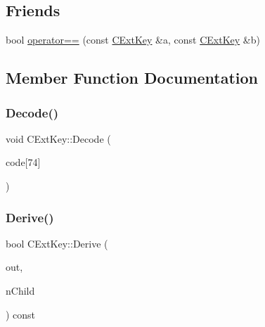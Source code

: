 \subsection*{Friends}
\begin{DoxyCompactItemize}
\item 
bool \mbox{\hyperlink{struct_c_ext_key_abd1d7fa4544c5a730a0d2a21d06fd3b3}{operator==}} (const \mbox{\hyperlink{struct_c_ext_key}{C\+Ext\+Key}} \&a, const \mbox{\hyperlink{struct_c_ext_key}{C\+Ext\+Key}} \&b)
\end{DoxyCompactItemize}


\subsection{Member Function Documentation}
\mbox{\label{struct_c_ext_key_a9720e119745472336b6729e19f0819dd}} 
\subsubsection{\texorpdfstring{Decode()}{Decode()}}
{\footnotesize\ttfamily void C\+Ext\+Key\+::\+Decode (\begin{DoxyParamCaption}\item[{const unsigned char}]{code\mbox{[}74\mbox{]} }\end{DoxyParamCaption})}

\mbox{\label{struct_c_ext_key_a589df63664c6d12bfe071b747a245b1d}} 
\subsubsection{\texorpdfstring{Derive()}{Derive()}}
{\footnotesize\ttfamily bool C\+Ext\+Key\+::\+Derive (\begin{DoxyParamCaption}\item[{\mbox{\hyperlink{struct_c_ext_key}{C\+Ext\+Key}} \&}]{out,  }\item[{unsigned int}]{n\+Child }\end{DoxyParamCaption}) const}

\mbox{\label{struct_c_ext_key_a4f68dfccef42685d954d3fb22fd6c67c}} 
